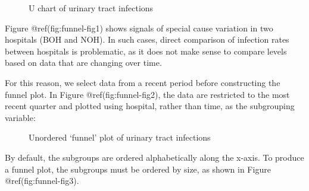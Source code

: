 \documentclass[
]{book}
\makeatletter
\newenvironment{Shaded}{\begin{snugshade}}{\end{snugshade}}
\newcommand{\AttributeTok}[1]{\textcolor[rgb]{0.13,0.29,0.53}{#1}}
\newcommand{\CommentTok}[1]{\textcolor[rgb]{0.56,0.35,0.01}{\textit{#1}}}
\newcommand{\DecValTok}[1]{\textcolor[rgb]{0.00,0.00,0.81}{#1}}
\newcommand{\FunctionTok}[1]{\textcolor[rgb]{0.13,0.29,0.53}{\textbf{#1}}}
\newcommand{\NormalTok}[1]{#1}
\newcommand{\OtherTok}[1]{\textcolor[rgb]{0.56,0.35,0.01}{#1}}
\newcommand{\SpecialCharTok}[1]{\textcolor[rgb]{0.81,0.36,0.00}{\textbf{#1}}}
\newcommand{\StringTok}[1]{\textcolor[rgb]{0.31,0.60,0.02}{#1}}
\newcommand*\pandocbounded[1]{%
  \sbox\pandoc@box{#1}%
  \Gscale@div\@tempa{\textheight}{\dimexpr\ht\pandoc@box+\dp\pandoc@box\relax}%
  \Gscale@div\@tempb{\linewidth}{\wd\pandoc@box}%
  \ifdim\@tempb\p@<\@tempa\p@\let\@tempa\@tempb\fi%
  \ifdim\@tempa\p@<\p@\scalebox{\@tempa}{\usebox\pandoc@box}%
  \else\usebox{\pandoc@box}%
  \fi%
}
\makeatother
\begin{document}
\begin{figure}
\centering
\pandocbounded{}
\caption{U chart of urinary tract infections}
\end{figure}

Figure @ref(fig:funnel-fig1) shows signals of special cause variation in
two hospitals (BOH and NOH). In such cases, direct comparison of
infection rates between hospitals is problematic, as it does not make
sense to compare levels based on data that are changing over time.

For this reason, we select data from a recent period before constructing
the funnel plot. In Figure @ref(fig:funnel-fig2), the data are
restricted to the most recent quarter and plotted using hospital, rather
than time, as the subgrouping variable:

\begin{Shaded}
\end{Shaded}

\begin{figure}
\centering
\pandocbounded{}
\caption{Unordered `funnel' plot of urinary tract infections}
\end{figure}

By default, the subgroups are ordered alphabetically along the x-axis.
To produce a funnel plot, the subgroups must be ordered by size, as
shown in Figure @ref(fig:funnel-fig3).
\end{document}
